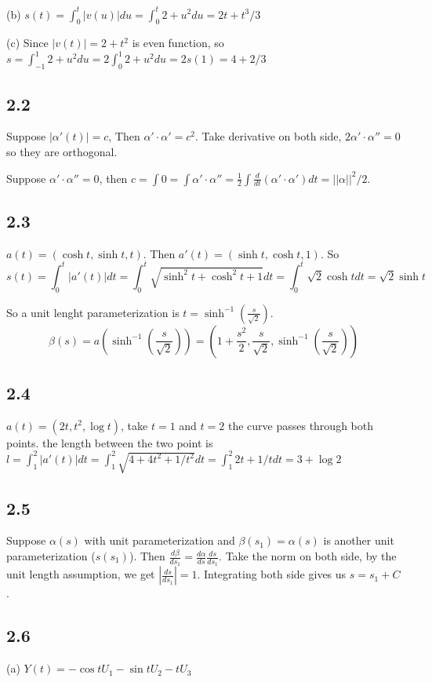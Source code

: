 \documentclass[12pt]{article}
\begin{document}
(b) $s(t) = \int^t_0 |v(u)| du =  \int^t_0 2 + u^2 du = 2t + t^3/3$

(c) Since $|v(t)| = 2+t^2$ is even function, so $s=\int^{1}_{-1}2+u^2du = 2 \int^1_0 2+u^2du = 2 s(1) = 4 + 2/3$

\subsection*{2.2}
Suppose $|\alpha'(t)| = c$, Then $ \alpha' \cdot \alpha' = c^2$. Take derivative on both side, $ 2 \alpha' \cdot \alpha '' = 0$ so they are orthogonal. 

Suppose $\alpha' \cdot \alpha '' = 0$,  then  $c = \int 0 = \int \alpha' \cdot \alpha '' = \frac{1}{2} \int \frac{d}{dt}(\alpha' \cdot \alpha' ) dt = ||\alpha||^2 /2$. \QED

\subsection*{2.3}
$a(t) = (\cosh t, \sinh t, t)$. Then $a'(t) = (\sinh t, \cosh t, 1)$. So $$s(t) = \int_0^{t}|a'(t)| dt = \int_0^t \sqrt{\sinh^2t + \cosh^2 t + 1} dt = \int_0^t \sqrt{2}\cosh t dt= \sqrt{2}\sinh t$$

So a unit lenght parameterization is $t = \sinh^{-1} \left( \frac{s}{\sqrt{2}}\right)$. $$\beta(s) = a( \sinh^{-1} \left( \frac{s}{\sqrt{2}}\right)) = \left(1 + \frac{s^2}{2},  \frac{s}{\sqrt{2}},  \sinh^{-1} \left( \frac{s}{\sqrt{2}}\right) \right)$$

\subsection*{2.4}
$a(t) = (2t, t^2, \log t)$, take $t=1$ and $t=2$ the curve passes through both points. the length between the two point is $l = \int^2_1 |a'(t)|dt = \int^2_1 \sqrt{4 + 4t^2 + 1/t^2}dt =  \int^2_1 2t + 1/t dt = 3 + \log 2$

\subsection*{2.5}
Suppose $\alpha(s)$ with unit parameterization and $\beta(s_1) = \alpha(s)$ is another unit parameterization ($s(s_1)$). Then $\frac{d\beta}{ds_1} = \frac{d\alpha}{ds} \frac{ds}{ds_1}$. Take the norm on both side, by the unit length assumption, we get $\left| \frac{ds}{ds_1} \right| = 1$. Integrating both side gives us $s = s_1 + C$. 

\subsection*{2.6}
(a) $Y(t) = -\cos tU_1  -\sin tU_2 - t U_3$
\end{document}
